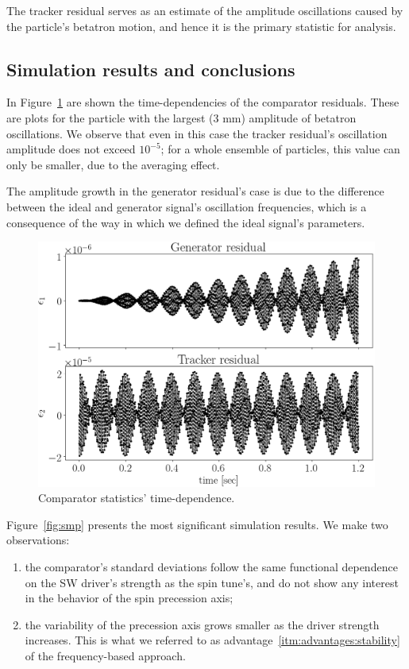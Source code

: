 \documentclass[]{elsarticle}
\begin{document}
The tracker residual serves as an estimate of the amplitude oscillations
caused by the particle's betatron motion, and hence it is the primary statistic for analysis.

\subsection{Simulation results and conclusions}

In Figure~\ref{fig:smp:resid_vs_time} are shown the time-dependencies of the comparator
residuals. These are plots for the particle with the largest (3 mm) amplitude of betatron oscillations.
We observe that even in this case the tracker residual's oscillation amplitude does not exceed
$10^{-5}$; for a whole ensemble of particles, this value can only be smaller, due to the averaging effect.

The amplitude growth in the generator residual's case is due to the difference between the ideal
and generator signal's oscillation frequencies, which is a consequence of the way in which we defined the
ideal signal's parameters.
\begin{figure}[h]
  \includegraphics[width=\linewidth]{img/smp_sim/residual_vs_time(both)}
  \caption{Comparator statistics' time-dependence.\label{fig:smp:resid_vs_time}}
\end{figure}

Figure~\ref{fig:smp} presents the most significant simulation results. We make two observations:
\begin{enumerate}[(1)]
\item the comparator's standard deviations follow the same functional dependence on the SW driver's
  strength as the spin tune's, and do not show any interest in the behavior of the spin precession axis;
\item the variability of the precession axis grows smaller as the driver strength increases. This is
  what we referred to as advantage~\ref{itm:advantages:stability} of the frequency-based approach.
\end{enumerate}
\end{document}
